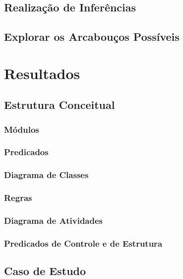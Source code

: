 \documentclass[openright]{normas-utf-tex} %
\begin{document}
    \section{Realização de Inferências}    
        
    \section{Explorar os Arcabouços Possíveis} 
        
\chapter{Resultados}
\label{chap:resul}
	
	\section{Estrutura Conceitual} \label{estconceitual}
		
		\subsection{Módulos} \label{mods}			
			
		\subsection{Predicados}\label{predic}
			
		\subsection{Diagrama de Classes}
			
		\subsection{Regras} \label{regras}
			
		\subsection{Diagrama de Atividades} \label{umldiagram}
			
		\subsection{Predicados de Controle e de Estrutura} \label{cenarios}
			
	\section{Caso de Estudo} \label{studycase}
			
\end{document}
